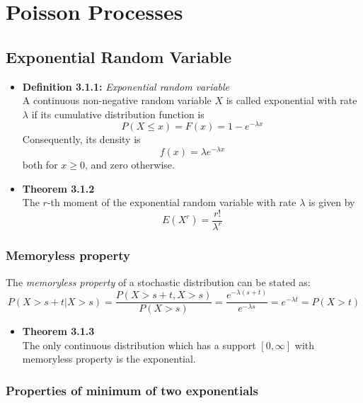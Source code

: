 \documentclass[11pt,a4paper]{article}
\begin{document}
\section{Poisson Processes}

\subsection{Exponential Random Variable}

\begin{itemize}

    \item \textbf{Definition 3.1.1:} \emph{Exponential random variable} \\
        A continuous non-negative random variable $X$ is called exponential with rate $\lambda$
        if its cumulative distribution function is
        \[
            P(X \leq x) = F(x) = 1 - e ^{-\lambda x}
        \]
        Consequently, its density is
        \[
            f(x) = \lambda e^{-\lambda x}
        \]
        both for $x \geq 0$, and zero otherwise.

    \item \textbf{Theorem 3.1.2} \\
        The $r$-th moment of the exponential random variable with rate $\lambda$ is given by
        \[
            E(X^r) = \frac{r!}{\lambda^r}
        \]

\end{itemize}

\subsubsection{Memoryless property}
The \emph{memoryless property} of a stochastic distribution can be stated as:
\[
    P(X>s+t|X>s) = \frac{P(X>s + t, X>s)}{P(X>s)} = \frac{e^{-\lambda (s+t)}}{e^{-\lambda s}}
    = e^{-\lambda t} = P(X>t)
\]

\begin{itemize}

    \item \textbf{Theorem 3.1.3} \\
        The only continuous distribution which has a support $[{0,\infty}]$
        with memoryless property is the exponential.

\end{itemize}

\subsubsection{Properties of minimum of two exponentials}
\end{document}
